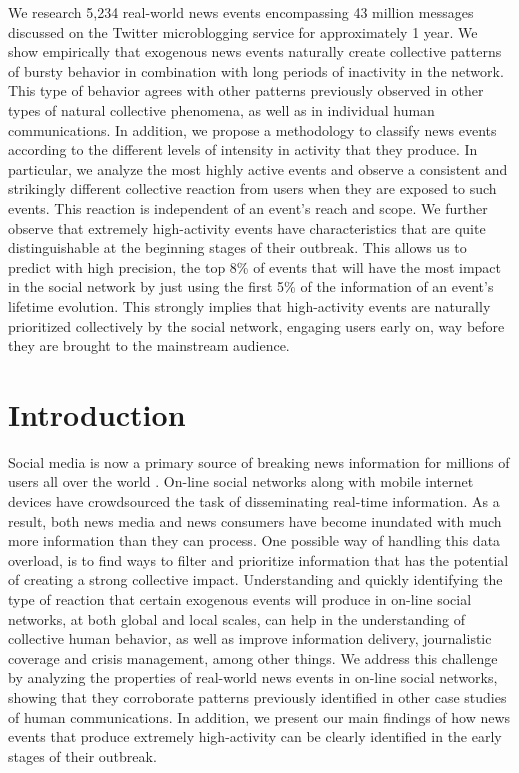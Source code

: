 \documentclass[10pt,letterpaper]{article}
\begin{document}
We research 5,234 real-world news events encompassing 43 million
messages discussed on the Twitter microblogging service for
approximately 1 year.  We show empirically that exogenous news events
naturally create
collective patterns of bursty behavior in combination with long periods of
inactivity in the network. This type of behavior agrees with
other patterns previously observed in other types of natural collective phenomena, as
well as in individual human communications. In addition, we propose a methodology to
classify news events according to the different levels of intensity in
activity that they produce. In particular, we analyze the most
highly active events and 
observe a consistent and strikingly different collective reaction
from users when they are exposed to such events.  This reaction is
independent of an event's reach and scope.  We further observe that
extremely high-activity events have characteristics that are quite distinguishable
at the beginning stages of their outbreak.  This allows us to predict
with high precision, the top 8\% of events that will have the most
impact in the social network by just using the first 5\% of the information of an
event's lifetime evolution. This strongly implies that high-activity events
are naturally prioritized collectively by the social network, engaging users early
on, way before they are brought to the mainstream audience.



\section*{Introduction}

Social media is now a primary source of breaking news information
for millions of users all over the world \cite{Kwak:2010}. On-line
social networks along with mobile internet devices have crowdsourced
the task of disseminating real-time information. As a result, both
news media and news consumers have become inundated with much more
information than they can process. One possible way of handling this data overload, is
to find ways to filter and prioritize information that has the
potential of creating a strong collective impact. Understanding and
quickly identifying the type of reaction that certain exogenous events will produce
in on-line social networks, at both global and local scales, can help
in the understanding of collective human behavior, as well as
improve information delivery, journalistic coverage and
crisis management, among other things. We
address this challenge by analyzing the properties of real-world news
events in on-line social networks, showing that they corroborate patterns
previously identified in other case studies of human communications. In
addition, we present our main findings of how news events that produce
extremely high-activity can be clearly identified in the early stages of
their outbreak.
\end{document}
